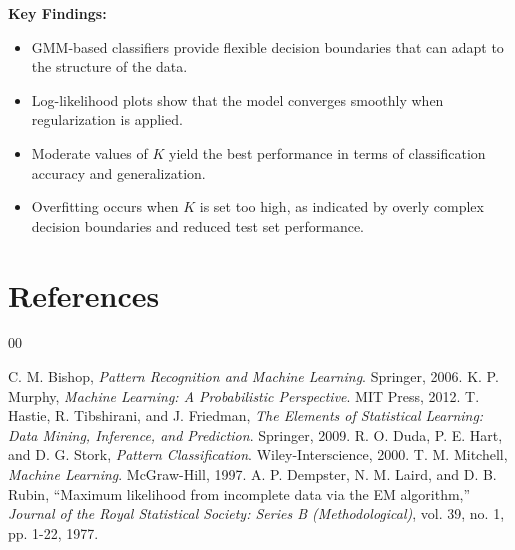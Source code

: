 \documentclass[conference]{IEEEtran}
\begin{document}
	\textbf{Key Findings:}
	\begin{itemize}
		\item GMM-based classifiers provide flexible decision boundaries that can adapt to the structure of the data.
		\item Log-likelihood plots show that the model converges smoothly when regularization is applied.
		\item Moderate values of \( K \) yield the best performance in terms of classification accuracy and generalization.
		\item Overfitting occurs when \( K \) is set too high, as indicated by overly complex decision boundaries and reduced test set performance.
	\end{itemize}
	
	
	
	\section{References}
	
	\begin{thebibliography}{00}
		
		 C. M. Bishop, \textit{Pattern Recognition and Machine Learning}. Springer, 2006.
		 K. P. Murphy, \textit{Machine Learning: A Probabilistic Perspective}. MIT Press, 2012.
		 T. Hastie, R. Tibshirani, and J. Friedman, \textit{The Elements of Statistical Learning: Data Mining, Inference, and Prediction}. Springer, 2009.
		 R. O. Duda, P. E. Hart, and D. G. Stork, \textit{Pattern Classification}. Wiley-Interscience, 2000.
		 T. M. Mitchell, \textit{Machine Learning}. McGraw-Hill, 1997.
		A. P. Dempster, N. M. Laird, and D. B. Rubin,
		``Maximum likelihood from incomplete data via the EM algorithm,''
		\textit{Journal of the Royal Statistical Society: Series B (Methodological)}, vol. 39, no. 1, pp. 1-22, 1977.
		
		
	\end{thebibliography}
	
	
\end{document}
